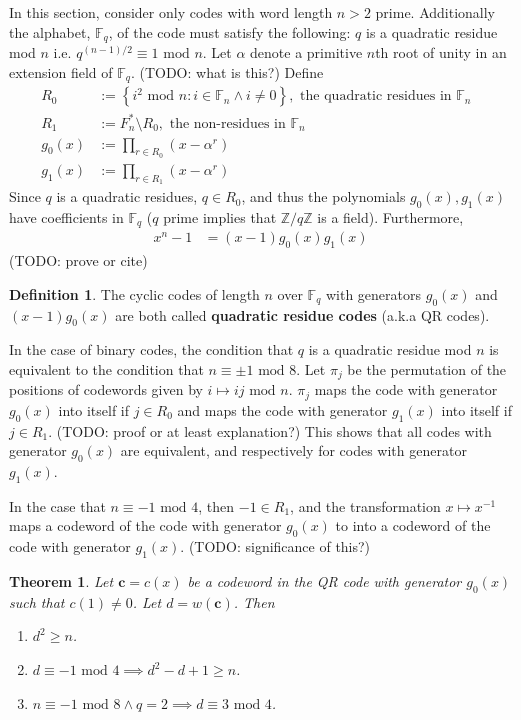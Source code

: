 \documentclass{article}
\renewcommand{\tt}[1]{\text{ #1 }}
\newcommand{\Z}{\mathbb{Z}}
\newcommand{\F}{\mathbb{F}}
\renewcommand{\mod}{\text{ mod }}
\newcommand{\mt}{\mapsto}
\renewcommand{\=}{\equiv}
\renewcommand{\i}{^{-1}}
\newcommand{\set}[1]{\left\{ #1 \right\}}
\renewcommand{\v}{\mathbf}
\theoremstyle{plain}
\newtheorem{thm}{Theorem}[subsection]
\theoremstyle{definition}
\newtheorem{defn}{Definition}[subsection]
\newcommand{\TODO}[1]{(TODO: #1)}
\begin{document}
In this section, consider only codes with word length $n > 2$ prime.
Additionally the alphabet, $\F_q$, of the code must satisfy the following: $q$ is a quadratic residue mod $n$ i.e. $q^{(n-1)/2} \= 1 \mod n$.
Let $\alpha$ denote a primitive $n$th root of unity in an extension field of $\F_q$. \TODO{what is this?}
Define
\begin{align}
  R_0 &:= \set{ i^2 \mod n : i \in \F_n \land i \neq 0 }, \tt{the quadratic residues in $\F_n$} \\
  R_1 &:= F_n^* \setminus R_0, \tt{the non-residues in $\F_n$} \\
  g_0(x) &:= \prod_{r \in R_0} (x - \alpha^r) \\
  g_1(x) &:= \prod_{r \in R_1} (x - \alpha^r)
\end{align}
Since $q$ is a quadratic residues, $q \in R_0$, and thus the polynomials $g_0(x), g_1(x)$ have coefficients in $\F_q$ ($q$ prime implies that $\Z/q\Z$ is a field).
Furthermore,
\begin{align}
  x^n - 1 &= (x-1) g_0(x) g_1(x)
\end{align}
\TODO{prove or cite}

\begin{defn}
  \label{def:qr-code}
  The cyclic codes of length $n$ over $\F_q$ with generators $g_0(x)$ and $(x-1)g_0(x)$ are both called \textbf{quadratic residue codes} (a.k.a QR codes).
\end{defn}

In the case of binary codes, the condition that $q$ is a quadratic residue mod $n$ is equivalent to the condition that $n \= \pm 1 \mod 8$.
Let $\pi_{j}$ be the permutation of the positions of codewords given by $i \mt ij \mod n$.
$\pi_j$ maps the code with generator $g_0(x)$ into itself if $j \in R_0$ and maps the code with generator $g_1(x)$ into itself if $j \in R_1$.
\TODO{proof or at least explanation?}
This shows that all codes with generator $g_0(x)$ are equivalent, and respectively for codes with generator $g_1(x)$.

In the case that $n \= -1 \mod 4$, then $-1 \in R_1$, and the transformation $x \mt x\i$ maps a codeword of the code with generator $g_0(x)$ to into a codeword of the code with generator $g_1(x)$.
\TODO{significance of this?}

\begin{thm}
  Let $\v c = c(x)$ be a codeword in the QR code with generator $g_0(x)$ such that $c(1) \neq 0$.
  Let $d = w(\v c)$.
  Then
  \begin{enumerate}
    \item[(i)] $d^2 \geq n$.
    \item[(ii)] $d \= -1 \mod 4 \implies d^2 - d + 1 \geq n$.
    \item[(iii)] $n \= -1 \mod 8 \land q = 2 \implies d \= 3 \mod 4$.
  \end{enumerate}
\end{thm}
\end{document}
